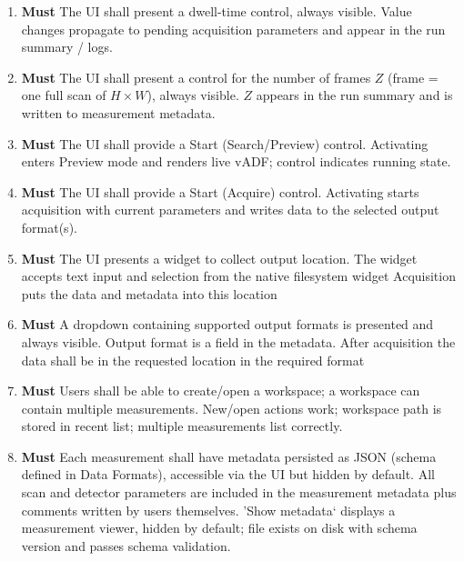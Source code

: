 \documentclass[12pt]{article}
\newcommand{\PriorityTag}[2]{%
  \colorbox{#2!25}{\footnotesize\textsf{\textbf{#1}}}\hspace{0.6em}}
\newcommand{\must}{\leavevmode\PriorityTag{Must}{green}}
\newcounter{reqgrp}[section] %
\newcounter{reqno}
\newcommand{\reqprefix}{GEN}
\newenvironment{requirements}[1]{%
  \renewcommand{\reqprefix}{#1}%
  \refstepcounter{reqgrp}%
  \setcounter{reqno}{0}%
  \begin{enumerate}[leftmargin=*]
}{\end{enumerate}}
\begin{document}
\begin{requirements}{UI}
\item \must {}
  {The UI shall present a dwell-time control, always visible.}
  {Value changes propagate to pending acquisition parameters and appear in the run summary / logs.}

\item \must {}
  {The UI shall present a control for the number of frames \(Z\) (frame = one full scan of \(H\times W\)), always visible.}
  {\(Z\) appears in the run summary and is written to measurement metadata.}

\item \must {}
  {The UI shall provide a Start (Search/Preview) control.}
  {Activating enters Preview mode and renders live vADF; control indicates running state.}

\item \must {}
  {The UI shall provide a Start (Acquire) control.}
  {Activating starts acquisition with current parameters and writes data to the selected output format(s).}

\item \must {}
  {The UI presents a widget to collect output location. The widget accepts text input and selection from the native filesystem widget}
  {Acquisition puts the data and metadata into this location}

\item \must {}
    {A dropdown containing supported output formats is presented and always visible.}
    {Output format is a field in the metadata. After acquisition the data shall be in the requested location in the required format}

\item \must {}
  {Users shall be able to create/open a workspace; a workspace can contain multiple measurements.}
  {New/open actions work; workspace path is stored in recent list; multiple measurements list correctly.}

\item \must {}
  {Each measurement shall have metadata persisted as JSON (schema defined in Data Formats), accessible via the UI but hidden by default. All scan and detector parameters are included in the measurement metadata plus comments written by users themselves.}
  {'Show metadata` displays a measurement viewer, hidden by default; file exists on disk with schema version and passes schema validation.}


\end{requirements}
\end{document}
